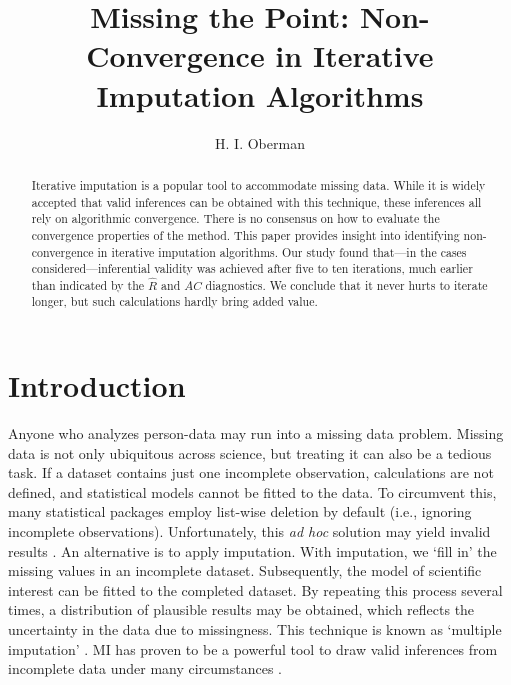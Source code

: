 \documentclass[Royal,times,sageh]{sagej}
\begin{document}
\title{Missing the Point: Non-Convergence in Iterative Imputation Algorithms}


\author{H. I. Oberman}




\begin{abstract}
Iterative imputation is a popular tool to accommodate missing data. While it is widely accepted that valid inferences can be obtained with this technique, these inferences all rely on algorithmic convergence. There is no consensus on how to evaluate the convergence properties of the method. This paper provides insight into identifying non-convergence in iterative imputation algorithms. Our study found that---in the cases considered---inferential validity was achieved after five to ten iterations, much earlier than indicated by the \(\widehat{R}\) and \(AC\) diagnostics. We conclude that it never hurts to iterate longer, but such calculations hardly bring added value.
\end{abstract}


\maketitle

\hypertarget{introduction}{%
\section{Introduction}\label{introduction}}

Anyone who analyzes person-data may run into a missing data problem. Missing data is not only ubiquitous across science, but treating it can also be a tedious task. If a dataset contains just one incomplete observation, calculations are not defined, and statistical models cannot be fitted to the data. To circumvent this, many statistical packages employ list-wise deletion by default (i.e., ignoring incomplete observations). Unfortunately, this \emph{ad hoc} solution may yield invalid results \citep{buur18}. An alternative is to apply imputation. With imputation, we `fill in' the missing values in an incomplete dataset. Subsequently, the model of scientific interest can be fitted to the completed dataset. By repeating this process several times, a distribution of plausible results may be obtained, which reflects the uncertainty in the data due to missingness. This technique is known as `multiple imputation' \citep[MI;][]{rubin76}. MI has proven to be a powerful tool to draw valid inferences from incomplete data under many circumstances \citep{buur18}.
\end{document}
